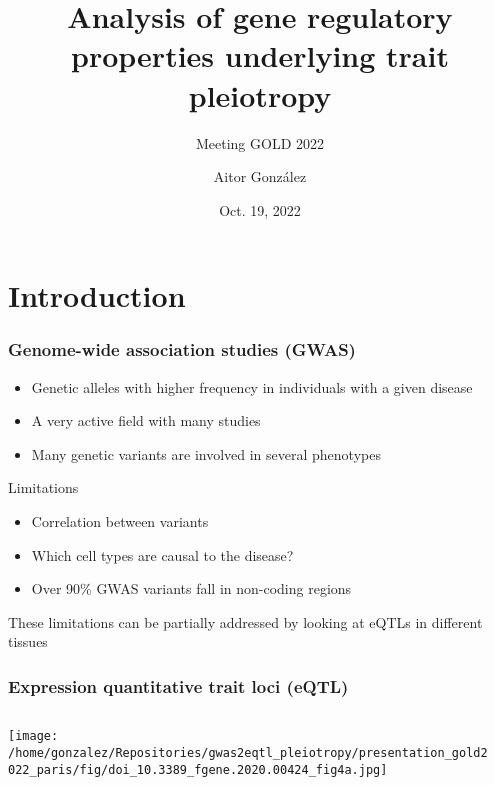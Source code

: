\documentclass{beamer}
\title{Analysis of gene regulatory properties underlying trait pleiotropy}
\subtitle{Meeting GOLD 2022}
\author{Aitor Gonz\'alez}
\institute{Aix Marseille Univ, INSERM, TAGC}
\date{Oct. 19, 2022}
\begin{document}
\begin{frame}

\titlepage

\end{frame}


\section{Introduction} %

\begin{frame}
\frametitle{Genome-wide association studies (GWAS)}

\begin{itemize}
\item Genetic alleles with higher frequency in individuals with a given disease
\item A very active field with many studies
\item Many genetic variants are involved in several phenotypes
\end{itemize}
%
\vfill
%
Limitations
%
\begin{itemize}
\item Correlation between variants
\item Which cell types are causal to the disease?
\item Over 90\% GWAS variants fall in non-coding regions
\end{itemize}
%
\vfill
%
These limitations can be partially addressed by looking at eQTLs in different tissues

\let\thefootnote\relax{}

\end{frame}

\begin{frame}
\frametitle{Expression quantitative trait loci (eQTL)}

\begin{columns}
\begin{column}{0.5\textwidth}
    \begin{center}
\texttt{[image: /home/gonzalez/Repositories/gwas2eqtl\_pleiotropy/presentation\_gold2022\_paris/fig/doi\_10.3389\_fgene.2020.00424\_fig4a.jpg]}
     \end{center}
\end{column}
\begin{column}{0.5\textwidth}

\end{column}
\end{columns}

\let\thefootnote\relax{}
\end{frame}
\end{document}
